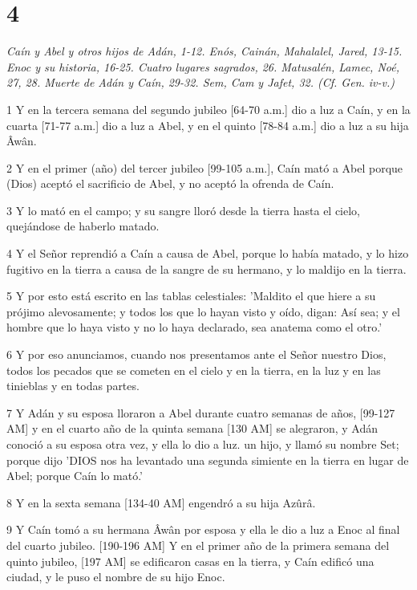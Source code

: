 \chapter{4}

\par \textit{Caín y Abel y otros hijos de Adán, 1-12. Enós, Cainán, Mahalalel, Jared, 13-15. Enoc y su historia, 16-25. Cuatro lugares sagrados, 26. Matusalén, Lamec, Noé, 27, 28. Muerte de Adán y Caín, 29-32. Sem, Cam y Jafet, 32. (Cf. Gen. iv-v.)}

\par 1 Y en la tercera semana del segundo jubileo [64-70 a.m.] dio a luz a Caín, y en la cuarta [71-77 a.m.] dio a luz a Abel, y en el quinto [78-84 a.m.] dio a luz a su hija Âwân.
\par 2 Y en el primer (año) del tercer jubileo [99-105 a.m.], Caín mató a Abel porque (Dios) aceptó el sacrificio de Abel, y no aceptó la ofrenda de Caín.
\par 3 Y lo mató en el campo; y su sangre lloró desde la tierra hasta el cielo, quejándose de haberlo matado.
\par 4 Y el Señor reprendió a Caín a causa de Abel, porque lo había matado, y lo hizo fugitivo en la tierra a causa de la sangre de su hermano, y lo maldijo en la tierra.
\par 5 Y por esto está escrito en las tablas celestiales: 'Maldito el que hiere a su prójimo alevosamente; y todos los que lo hayan visto y oído, digan: Así sea; y el hombre que lo haya visto y no lo haya declarado, sea anatema como el otro.'
\par 6 Y por eso anunciamos, cuando nos presentamos ante el Señor nuestro Dios, todos los pecados que se cometen en el cielo y en la tierra, en la luz y en las tinieblas y en todas partes.
\par 7 Y Adán y su esposa lloraron a Abel durante cuatro semanas de años, [99-127 AM] y en el cuarto año de la quinta semana [130 AM] se alegraron, y Adán conoció a su esposa otra vez, y ella lo dio a luz. un hijo, y llamó su nombre Set; porque dijo 'DIOS nos ha levantado una segunda simiente en la tierra en lugar de Abel; porque Caín lo mató.'
\par 8 Y en la sexta semana [134-40 AM] engendró a su hija Azûrâ.
\par 9 Y Caín tomó a su hermana Âwân por esposa y ella le dio a luz a Enoc al final del cuarto jubileo. [190-196 AM] Y en el primer año de la primera semana del quinto jubileo, [197 AM] se edificaron casas en la tierra, y Caín edificó una ciudad, y le puso el nombre de su hijo Enoc.
